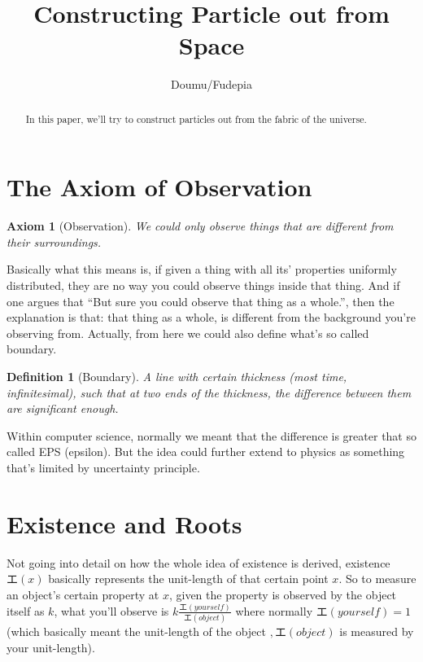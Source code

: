 \documentclass[preprint]{ptephy_v1}%
\newcommand{\jp}[1]{#1}
\newcommand{\jp}[1]{\text{#1}}
\newtheorem{axiom}{Axiom}
\newtheorem{dfn}{Definition}
\begin{document}

\title{Constructing Particle out from Space}


\author{Doumu/Fudepia}

\begin{abstract}
    In this paper, we'll try to construct particles out from the fabric of the universe.
\end{abstract}



\maketitle



\section{The Axiom of Observation}
\begin{axiom}[Observation]
    We could only observe things that are different from their surroundings.
\end{axiom}

Basically what this means is, if given a thing with all its' properties uniformly distributed, they are no way you could observe things inside that thing. And if one argues that ``But sure you could observe that thing as a whole.'', then the explanation is that: that thing as a whole, is different from the background you're observing from. Actually, from here we could also define what's so called boundary.

\begin{dfn}[Boundary]
    A line with certain thickness (most time, infinitesimal), such that at two ends of the thickness, the difference between them are significant enough.
\end{dfn}

Within computer science, normally we meant that the difference is greater that so called EPS (epsilon). But the idea could further extend to physics as something that's limited by uncertainty principle.

\section{Existence and Roots}
Not going into detail on how the whole idea of existence is derived, existence $\jp{エ}(x)$ basically represents the unit-length of that certain point $x$. So to measure an object's certain property at $x$, given the property is observed by the object itself as $k$, what you'll observe is $k\frac{\jp{エ}(yourself)}{\jp{エ}(object)}$ where normally $\jp{エ}(yourself)=1$ (which basically meant the unit-length of the object $,\jp{エ}(object)$ is measured by your unit-length).~\cite{mucoe}
\end{document}
